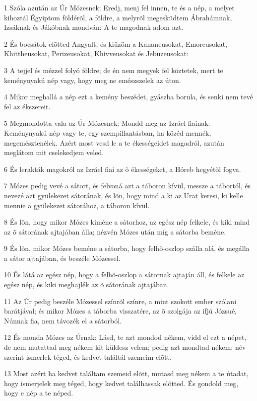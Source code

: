 \par 1 Szóla azután az Úr Mózesnek: Eredj, menj fel innen, te és a nép, a melyet kihoztál Égyiptom földérõl, a földre, a melyrõl megesküdtem Ábrahámnak, Izsáknak és Jákóbnak mondván: A te magodnak adom azt.
\par 2 És bocsátok elõtted Angyalt, és kiûzöm a Kananeusokat, Emoreusokat, Khittheusokat, Perizeusokat, Khivveusokat és Jebuzeusokat:
\par 3 A tejjel és mézzel folyó földre; de én nem megyek fel köztetek, mert te keménynyakú nép vagy, hogy meg ne emészszelek az úton.
\par 4 Mikor meghallá a nép ezt a kemény beszédet, gyászba borula, és senki nem tevé fel az ékszereit.
\par 5 Megmondotta vala az Úr Mózesnek: Mondd meg az Izráel fiainak: Keménynyakú nép vagy te, egy szempillantásban, ha közéd mennék, megemésztenélek. Azért most vesd le a te ékességeidet magadról, azután meglátom mit cselekedjem veled.
\par 6 És lerakták magokról az Izráel fiai az õ ékességeket, a Hóreb hegyétõl fogva.
\par 7 Mózes pedig vevé a sátort, és felvoná azt a táboron kívül, messze a tábortól, és nevezé azt gyülekezet sátorának, és lõn, hogy mind a ki az Urat keresi, ki kelle mennie a gyülekezet sátorához, a táboron kívül.
\par 8 És lõn, hogy mikor Mózes kiméne a sátorhoz, az egész nép felkele, és kiki mind az õ sátorának ajtajában álla; nézvén Mózes után míg a sátorba beméne.
\par 9 És lõn, mikor Mózes beméne a sátorba, hogy felhõ-oszlop szálla alá, és megálla a sátor ajtajában, és beszéle Mózessel.
\par 10 És látá az egész nép, hogy a felhõ-oszlop a sátornak ajtaján áll, és felkele az egész nép, és kiki meghajlék az õ sátorának ajtajában.
\par 11 Az Úr pedig beszéle Mózessel színrõl színre, a mint szokott ember szólani barátjával; és mikor Mózes a táborba visszatére, az õ szolgája az ifjú Józsué, Núnnak  fia, nem távozék el a sátorból.
\par 12 És monda Mózes az Úrnak: Lásd, te azt mondod nékem, vidd el ezt a népet, de nem mutattad meg nékem kit küldesz velem; pedig azt mondtad nékem: név szerint ismerlek téged, és kedvet találtál szemeim elõtt.
\par 13 Most azért ha kedvet találtam szemeid elõtt, mutasd meg nékem a te útadat, hogy ismerjelek meg téged, hogy kedvet találhassak elõtted. És gondold meg, hogy e nép a te néped.

